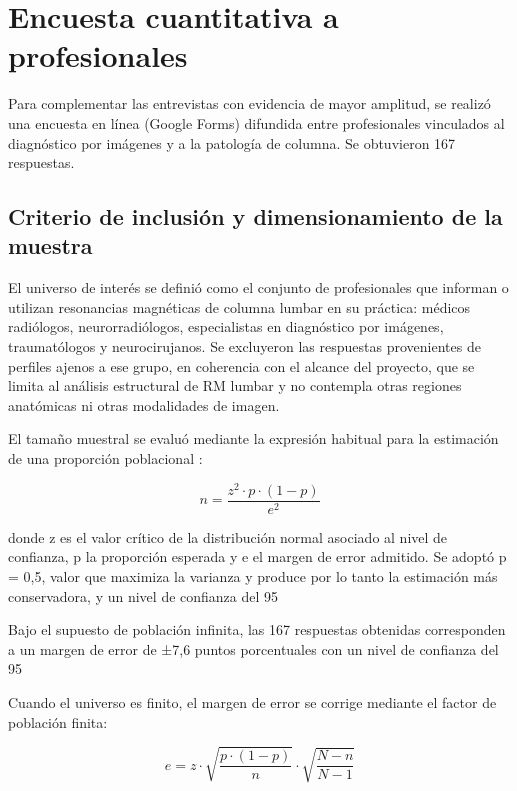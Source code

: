\section{Encuesta cuantitativa a profesionales}

Para complementar las entrevistas con evidencia de mayor amplitud, se realizó una encuesta en línea (Google Forms) difundida entre profesionales vinculados al diagnóstico por imágenes y a la patología de columna. Se obtuvieron 167 respuestas.

\subsection{Criterio de inclusión y dimensionamiento de la muestra}

El universo de interés se definió como el conjunto de profesionales que informan o utilizan resonancias magnéticas de columna lumbar en su práctica: médicos radiólogos, neurorradiólogos, especialistas en diagnóstico por imágenes, traumatólogos y neurocirujanos. Se excluyeron las respuestas provenientes de perfiles ajenos a ese grupo, en coherencia con el alcance del proyecto, que se limita al análisis estructural de RM lumbar y no contempla otras regiones anatómicas ni otras modalidades de imagen.

El tamaño muestral se evaluó mediante la expresión habitual para la estimación de una proporción poblacional \parencite{cochran_sampling_techniques_1977}:

\[
n = \frac{z^2 \cdot p \cdot (1 - p)}{e^2}
\tag{10.1}
\]

donde z es el valor crítico de la distribución normal asociado al nivel de confianza, p la proporción esperada y e el margen de error admitido. Se adoptó p = 0,5, valor que maximiza la varianza y produce por lo tanto la estimación más conservadora, y un nivel de confianza del 95 %

Bajo el supuesto de población infinita, las 167 respuestas obtenidas corresponden a un margen de error de ±7,6 puntos porcentuales con un nivel de confianza del 95 %

Cuando el universo es finito, el margen de error se corrige mediante el factor de población finita:

\[
e = z \cdot \sqrt{\frac{p \cdot (1 - p)}{n}} \cdot \sqrt{\frac{N - n}{N - 1}}
\tag{10.2}
\]

